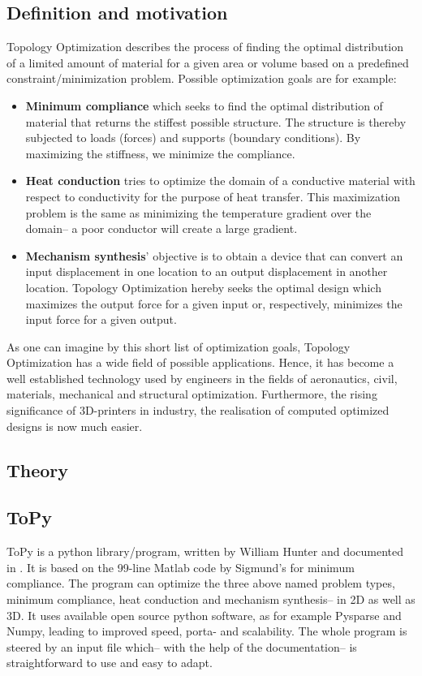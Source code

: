 \subsection{Definition and motivation}
Topology Optimization describes the process of finding the optimal distribution of a limited amount of material for a given area or volume based on a predefined constraint/minimization problem. Possible optimization goals are for example:
\begin{itemize}
\item \textbf{Minimum compliance} which seeks to find the optimal distribution of material that returns the stiffest possible structure. The structure is thereby subjected to loads (forces) and supports (boundary conditions). By maximizing the stiffness, we minimize the compliance.
\item \textbf{Heat conduction} tries to optimize the domain of a conductive material with respect to conductivity for the purpose of heat transfer. This maximization problem is the same as minimizing the temperature gradient over the domain-- a poor conductor will create a large gradient.
\item \textbf{Mechanism synthesis}' objective is to obtain a device that can convert an input displacement in one location to an output displacement in another location. Topology Optimization hereby seeks the optimal design which maximizes the output force for a given input or, respectively, minimizes the input force for a given output.
\end{itemize}


As one can imagine by this short list of optimization goals, Topology Optimization has a wide field of possible applications. Hence, it has become a well established technology used by engineers in the fields of aeronautics, civil, materials, mechanical and structural optimization. Furthermore, the rising significance of 3D-printers in industry, the realisation of computed optimized designs is now much easier.

\subsection{Theory}

\subsection{ToPy}
ToPy \cite{ToPy} is a python library/program, written by William Hunter and documented in \cite{Hunter2009}. It is based on the 99-line Matlab code by Sigmund's for minimum compliance. The program can optimize the three above named problem types, minimum compliance, heat conduction and mechanism synthesis-- in 2D as well as 3D. It uses available open source python software, as for example Pysparse and Numpy, leading to improved speed, porta- and scalability. The whole program is steered by an input file which-- with the help of the documentation-- is straightforward to use and easy to adapt. 


